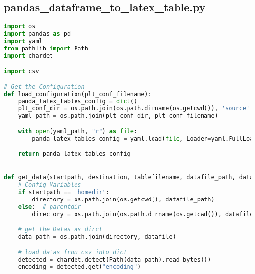 
\subsection{pandas\_dataframe\_to\_latex\_table.py}
\lstset{style=gra_codestyle}
\begin{lstlisting}[language=python, caption=Python LaTex - pandas\_dataframe\_to\_latex\_table.py CSV - LaTex Tabelle,captionpos=b,label={lst:Python LaTex - pandas_dataframe_to_latex_table},breaklines=true]
import os
import pandas as pd
import yaml
from pathlib import Path
import chardet

import csv

# Get the Configuration
def load_configuration(plt_conf_filename):
    panda_latex_tables_config = dict()
    plt_conf_dir = os.path.join(os.path.dirname(os.getcwd()), 'source', 'configuration')
    yaml_path = os.path.join(plt_conf_dir, plt_conf_filename)

    with open(yaml_path, "r") as file:
        panda_latex_tables_config = yaml.load(file, Loader=yaml.FullLoader)

    return panda_latex_tables_config


def get_data(startpath, destination, tablefilename, datafile_path, datafile, alternative_cvs_load, separator, decimal):
    # Config Variables
    if startpath == 'homedir':
        directory = os.path.join(os.getcwd(), datafile_path)
    else:  # parentdir
        directory = os.path.join(os.path.dirname(os.getcwd()), datafile_path)

    # get the Datas as dirct
    data_path = os.path.join(directory, datafile)

    # load datas from csv into dict
    detected = chardet.detect(Path(data_path).read_bytes())
    encoding = detected.get("encoding")


\end{lstlisting}
